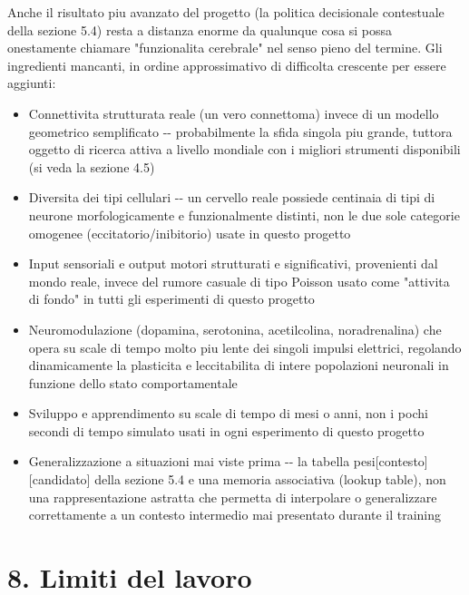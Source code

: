 \documentclass[
  italian,
]{article}
\begin{document}
Anche il risultato piu\textquotesingle{} avanzato del progetto (la politica decisionale contestuale della sezione 5.4) resta a distanza enorme da qualunque cosa si possa onestamente chiamare "funzionalita\textquotesingle{} cerebrale" nel senso pieno del termine. Gli ingredienti mancanti, in ordine approssimativo di difficolta\textquotesingle{} crescente per essere aggiunti:

\begin{itemize}
\item
  Connettivita\textquotesingle{} strutturata reale (un vero connettoma) invece di un modello geometrico semplificato -\/- probabilmente la sfida singola piu\textquotesingle{} grande, tuttora oggetto di ricerca attiva a livello mondiale con i migliori strumenti disponibili (si veda la sezione 4.5)
\item
  Diversita\textquotesingle{} dei tipi cellulari -\/- un cervello reale possiede centinaia di tipi di neurone morfologicamente e funzionalmente distinti, non le due sole categorie omogenee (eccitatorio/inibitorio) usate in questo progetto
\item
  Input sensoriali e output motori strutturati e significativi, provenienti dal mondo reale, invece del rumore casuale di tipo Poisson usato come "attivita\textquotesingle{} di fondo" in tutti gli esperimenti di questo progetto
\item
  Neuromodulazione (dopamina, serotonina, acetilcolina, noradrenalina) che opera su scale di tempo molto piu\textquotesingle{} lente dei singoli impulsi elettrici, regolando dinamicamente la plasticita\textquotesingle{} e l\textquotesingle eccitabilita\textquotesingle{} di intere popolazioni neuronali in funzione dello stato comportamentale
\item
  Sviluppo e apprendimento su scale di tempo di mesi o anni, non i pochi secondi di tempo simulato usati in ogni esperimento di questo progetto
\item
  Generalizzazione a situazioni mai viste prima -\/- la tabella pesi{[}contesto{]}{[}candidato{]} della sezione 5.4 e\textquotesingle{} una memoria associativa (lookup table), non una rappresentazione astratta che permetta di interpolare o generalizzare correttamente a un contesto intermedio mai presentato durante il training
\end{itemize}

\section{8. Limiti del lavoro}\label{limiti-del-lavoro}
\end{document}
